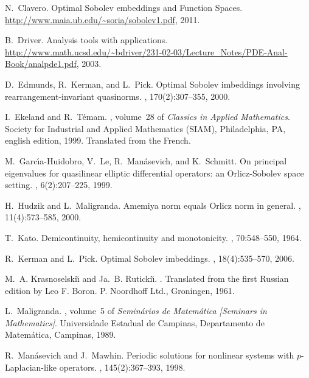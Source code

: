 \documentclass[twoside]{elsarticle}
\theoremstyle{remark}
\begin{document}
\begin{thebibliography}{10}
N.~Clavero.
\newblock Optimal {S}obolev embeddings and {F}unction {S}paces.
\newblock \url{http://www.maia.ub.edu/~soria/sobolev1.pdf}, 2011.

B.~Driver.
\newblock Analysis tools with applications.
\newblock
  \url{http://www.math.ucsd.edu/~bdriver/231-02-03/Lecture_Notes/PDE-Anal-Book/analpde1.pdf},
  2003.

D.~Edmunds, R.~Kerman, and L.~Pick.
\newblock Optimal {S}obolev imbeddings involving rearrangement-invariant
  quasinorms.
, 170(2):307--355, 2000.

I.~Ekeland and R.~T{\'e}mam.
, volume~28 of {\em
  Classics in Applied Mathematics}.
\newblock Society for Industrial and Applied Mathematics (SIAM), Philadelphia,
  PA, english edition, 1999.
\newblock Translated from the French.

M.~Garc{\'{\i}}a-Huidobro, V.~Le, R.~Man{\'a}sevich, and K.~Schmitt.
\newblock On principal eigenvalues for quasilinear elliptic differential
  operators: an {O}rlicz-{S}obolev space setting.
, 6(2):207--225,
  1999.

H.~Hudzik and L.~Maligranda.
\newblock Amemiya norm equals {O}rlicz norm in general.
, 11(4):573--585, 2000.

T.~Kato.
\newblock Demicontinuity, hemicontinuity and monotonicity.
, 70:548--550, 1964.

R.~Kerman and L.~Pick.
\newblock Optimal {S}obolev imbeddings.
, 18(4):535--570, 2006.

M.~A. Krasnosel{\cprime}ski{\u\i} and Ja.~B. Ruticki{\u\i}.
.
\newblock Translated from the first Russian edition by Leo F. Boron. P.
  Noordhoff Ltd., Groningen, 1961.

L.~Maligranda.
, volume~5 of {\em Semin\'arios
  de Matem\'atica [Seminars in Mathematics]}.
\newblock Universidade Estadual de Campinas, Departamento de Matem\'atica,
  Campinas, 1989.

R.~Man{\'a}sevich and J.~Mawhin.
\newblock Periodic solutions for nonlinear systems with {$p$}-{L}aplacian-like
  operators.
, 145(2):367--393, 1998.


\end{thebibliography}
\end{document}

